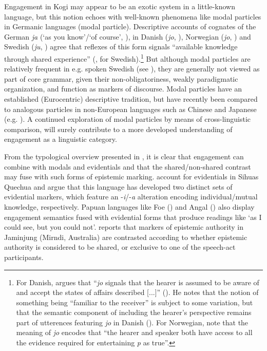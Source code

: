 \documentclass[output=paper]{langsci/langscibook}
\begin{document}
Engagement in Kogi may appear to be an exotic system in a little-known language, but this notion echoes with well-known phenomena like modal particles in Germanic languages (modal particle). Descriptive accounts of cognates of the German \textit{ja} (‘as you know’/`of course’, \citealt{Abraham1991}), in Danish (\textit{jo}, \citealt{Davidsen1996}), Norwegian (\textit{jo}, \citealt{Andvik1992}) and Swedish (\textit{ju}, \citealt{Lindstrom2008}) agree that reflexes of this form signals “available knowledge through shared experience” (\citealt[74]{Lindstrom2008}, for Swedish).\footnote{For Danish, \citeauthor{Davidsen1996} argues that ``\textit{jo} signals that the hearer is assumed to be aware of and accept the states of affairs described [...]” (\citealt[285]{Davidsen1996}). He notes that the notion of something being ``familiar to the receiver” is subject to some variation, but that the semantic component of including the hearer’s perspective remains part of utterences featuring \textit{jo} in Danish (\citealt[293]{Davidsen1996}). For Norwegian, \cite{Berthelinetal} note that the meaning of \textit{jo} encodes that ``the hearer and speaker both have access to all the evidence required for entertaining \textit{p} as true”.}
But although modal particles are relatively frequent in e.g. spoken Swedish (see \citealt{Bergqvist2017}), they are generally not viewed as part of core grammar, given their non-obligatoriness, weakly paradigmatic organization, and function as markers of discourse. Modal particles have an established (Eurocentric) descriptive tradition, but have recently been compared to analogous particles in non-European languages such as Chinese and Japanese (e.g. \citealt{AbrahamLeiss2012}). A continued exploration of modal particles by means of cross-linguistic comparison, will surely contribute to a more developed understanding of engagement as a linguistic category. 

From the typological overview presented in \cite{Evansetal2017b}, it is clear that engagement can combine with modals and evidentials and that the shared/non-shared contrast may fuse with such forms of epistemic marking. \cite{Hintz2017} account for evidentials in Sihuas Quechua and argue that this language has developed two distinct sets of evidential markers, which feature an -\textit{i}/-\textit{a} alteration encoding individual/mutual knowledge, respectively. Papuan languages like Foe (\citealt{Rule1977}) and Angal (\citealt{Sillitoe2010}) also display engagement semantics fused with evidential forms that produce readings like `as I could see, but you could not'. \cite{SchultzeBerndt2017} reports that markers of epistemic authority in Jaminjung (Mirndi, Australia) are contrasted according to whether epistemic authority is considered to be shared, or exclusive to one of the speech-act participants.
\end{document}

